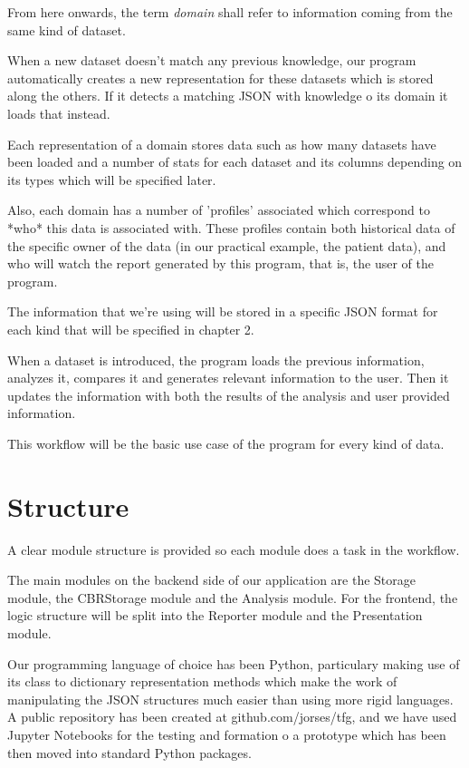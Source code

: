 From here onwards, the term \textit{domain} shall refer to information coming from the same kind of dataset.

When a new dataset doesn't match any previous knowledge, our program automatically creates a new representation for these datasets which is stored along the others. If it detects a matching JSON with knowledge o its domain it loads that instead.

Each representation of a domain stores data such as how many datasets have been loaded and a number of stats for each dataset and its columns depending on its types which will be specified later.

Also, each domain has a number of 'profiles' associated which correspond to *who* this data is associated with. These profiles contain both historical data of the specific owner of the data (in our practical example, the patient data), and who will watch the report generated by this program, that is, the user of the program.

The information that we're using will be stored in a specific JSON format for each kind that will be specified in chapter 2.

When a dataset is introduced, the program loads the previous information, analyzes it, compares it and generates relevant information to the user. Then it updates the information with both the results of the analysis and user provided information.

This workflow will be the basic use case of the program for every kind of data.

\section{Structure}
\label{cap1:sec:structure}
A clear module structure is provided so each module does a task in the workflow.

The main modules on the backend side of our application are the Storage module, the CBRStorage module and the Analysis module.
For the frontend, the logic structure will be split into the Reporter module and the Presentation module.

Our programming language of choice has been Python, particulary making use of its class to dictionary representation methods which make the work of manipulating the JSON structures much easier than using more rigid languages.
A public repository has been created at github.com/jorses/tfg, and we have used Jupyter Notebooks for the testing and formation o a prototype which has been then moved into standard Python packages.

